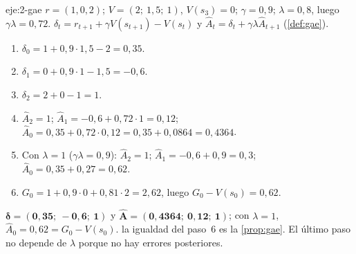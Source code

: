 \begin{solucion}{eje:2-gae}
\datos $r=(1,0,2)$; $V=(2;\ 1{,}5;\ 1)$, $V(s_3)=0$; $\gamma=0{,}9$; $\lambda=0{,}8$, luego $\gamma\lambda=0{,}72$.
\planteamiento $\delta_t=r_{t+1}+\gamma V(s_{t+1})-V(s_t)$ y $\widehat A_t=\delta_t+\gamma\lambda\widehat A_{t+1}$ (\cref{def:gae}).
\pasos
\begin{enumerate}[label=\arabic*.]
  \item $\delta_0=1+0{,}9\cdot 1{,}5-2=0{,}35$.
  \item $\delta_1=0+0{,}9\cdot 1-1{,}5=-0{,}6$.
  \item $\delta_2=2+0-1=1$.
  \item $\widehat A_2=1$; $\widehat A_1=-0{,}6+0{,}72\cdot 1=0{,}12$; $\widehat A_0=0{,}35+0{,}72\cdot 0{,}12=0{,}35+0{,}0864=0{,}4364$.
  \item Con $\lambda=1$ ($\gamma\lambda=0{,}9$): $\widehat A_2=1$; $\widehat A_1=-0{,}6+0{,}9=0{,}3$; $\widehat A_0=0{,}35+0{,}27=0{,}62$.
  \item $G_0=1+0{,}9\cdot 0+0{,}81\cdot 2=2{,}62$, luego $G_0-V(s_0)=0{,}62$.
\end{enumerate}
\resultado $\mathbf{\delta=(0{,}35;\ -0{,}6;\ 1)}$ y $\mathbf{\widehat A=(0{,}4364;\ 0{,}12;\ 1)}$; con $\lambda=1$, $\widehat A_0=0{,}62=G_0-V(s_0)$.
\comprobacion la igualdad del paso~6 es la \cref{prop:gae}. El último paso no depende de $\lambda$ porque no hay errores posteriores.
\end{solucion}

